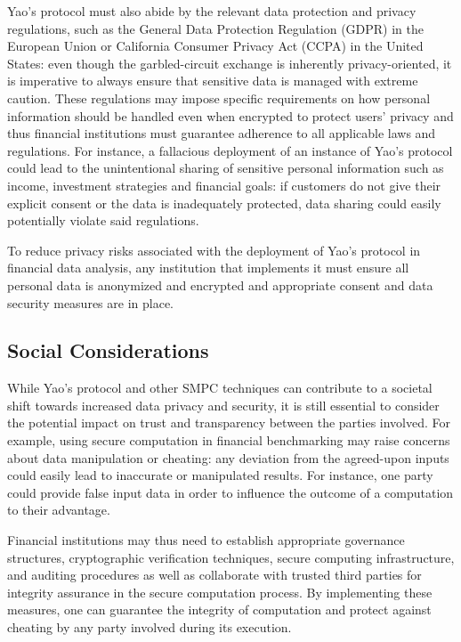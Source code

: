 \documentclass[12pt]{article}
\begin{document}
Yao's protocol must also abide by the relevant data protection and privacy regulations, such as the General Data Protection Regulation (GDPR) in the European Union or California Consumer Privacy Act (CCPA) in the United States: even though the garbled-circuit exchange is inherently privacy-oriented, it is imperative to always ensure that sensitive data is managed with extreme caution. These regulations may impose specific requirements on how personal information should be handled even when encrypted to protect users' privacy and thus financial institutions must guarantee adherence to all applicable laws and regulations. For instance, a fallacious deployment of an instance of Yao's protocol could lead to the unintentional sharing of sensitive personal information such as income, investment strategies and financial goals: if customers do not give their explicit consent or the data is inadequately protected, data sharing could easily potentially violate said regulations.

To reduce privacy risks associated with the deployment of Yao's protocol in financial data analysis, any institution that implements it must ensure all personal data is anonymized and encrypted and appropriate consent and data security measures are in place.

\subsection{Social Considerations}

While Yao's protocol and other SMPC techniques can contribute to a societal shift towards increased data privacy and security, it is still essential to consider the potential impact on trust and transparency between the parties involved. For example, using secure computation in financial benchmarking may raise concerns about data manipulation or cheating: any deviation from the agreed-upon inputs could easily lead to inaccurate or manipulated results. For instance, one party could provide false input data in order to influence the outcome of a computation to their advantage.

Financial institutions may thus need to establish appropriate governance structures, cryptographic verification techniques, secure computing infrastructure, and auditing procedures as well as collaborate with trusted third parties for integrity assurance in the secure computation process. By implementing these measures, one can guarantee the integrity of computation and protect against cheating by any party involved during its execution.
\end{document}
